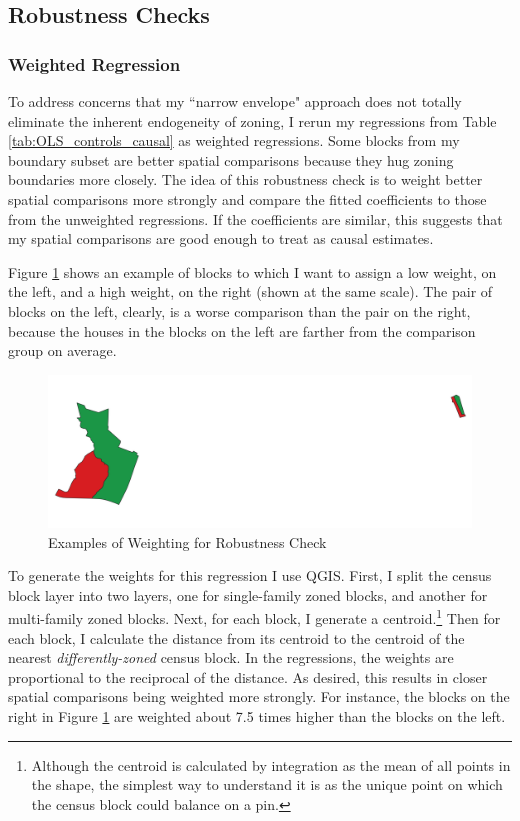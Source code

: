 \documentclass[11pt]{article}
\begin{document}
\subsection{Robustness Checks}

\subsubsection{Weighted Regression}

To address concerns that my ``narrow envelope" approach does not totally eliminate the inherent endogeneity of zoning, I rerun my regressions from Table \ref{tab:OLS_controls_causal} as weighted regressions. Some blocks from my boundary subset are better spatial comparisons because they hug zoning boundaries more closely. The idea of this robustness check is to weight better spatial comparisons more strongly and compare the fitted coefficients to those from the unweighted regressions. If the coefficients are similar, this suggests that my spatial comparisons are good enough to treat as causal estimates.

Figure \ref{fig:Weighted_reg_demo} shows an example of blocks to which I want to assign a low weight, on the left, and a high weight, on the right (shown at the same scale). The pair of blocks on the left, clearly, is a worse comparison than the pair on the right, because the houses in the blocks on the left are farther from the comparison group on average.

\begin{figure}[H]
    \centering
    \includegraphics[width=\textwidth]{Weighting_Example_Cropped.png}
    \caption{Examples of Weighting for Robustness Check}
    \label{fig:Weighted_reg_demo}
\end{figure}

To generate the weights for this regression I use QGIS. First, I split the census block layer into two layers, one for single-family zoned blocks, and another for multi-family zoned blocks. Next, for each block, I generate a centroid.\footnote{Although the centroid is calculated by integration as the mean of all points in the shape, the simplest way to understand it is as the unique point on which the census block could balance on a pin.} Then for each block, I calculate the distance from its centroid to the centroid of the nearest \textit{differently-zoned} census block. In the regressions, the weights are proportional to the reciprocal of the distance. As desired, this results in closer spatial comparisons being weighted more strongly. For instance, the blocks on the right in Figure \ref{fig:Weighted_reg_demo} are weighted about 7.5 times higher than the blocks on the left.
\end{document}
